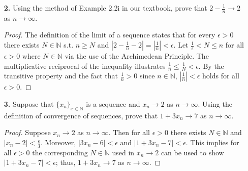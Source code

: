 \documentclass[ 12pt ]{article}
\begin{document}
\begin{enumerate}
\begin{enumerate}
		\item[\textbf{d.}] If $x_n$ converges to zero and $y_n > 0$ for all
		$n \in \mathbb{N}$, then $x_n y_n$ converges.

		\begin{proof}[Disproof]
			Let $x_n = \frac{1}{n}$ and $y_n = n^2$. We can see that
			$\frac{1}{n} \rightarrow 0$ as $n \rightarrow \infty$. Also
			$n^2 > 0$ for all $n \in \mathbb{N}$, otherwise this would
			contradict closure of $\mathbb{N}$ under multiplication. The product
			$x_n y_n = \frac{1}{n} \cdot n^2 = n$ which does not converge as
			$n \rightarrow \infty$.
		\end{proof}

	\end{enumerate}


	\item[\textbf{2.}] Using the method of Example 2.2i in our textbook, prove
	that $2 - \frac{1}{n} \rightarrow 2$ as $n \rightarrow \infty$.

	\begin{proof}
		The definition of the limit of a sequence states that for every
		$\epsilon > 0$ there exists $N \in \mathbb{N}$ s.t. $n \geq N$
		and $|2 - \frac{1}{n} - 2| = |\frac{1}{n}| < \epsilon$.
		Let $\frac{1}{\epsilon} < N \leq n$ for all $\epsilon > 0$ where
		$N \in \mathbb{N}$ via the use of the Archimedean Principle. The
		multiplicative reciprocal of the inequality illustrates
		$\frac{1}{n} \leq \frac{1}{N} < \epsilon$. By the transitive property
		and the fact that $\frac{1}{n} > 0$ since $n \in \mathbb{N}$,
		$|\frac{1}{n}| < \epsilon$ holds for all $\epsilon > 0$.
	\end{proof}


	\item[\textbf{3.}] Suppose that $\{ x_n \}_{x \in \mathbb{N}}$ is a
	sequence and $x_n \rightarrow 2$ as $n \rightarrow \infty$. Using the
	definition of convergence of sequences, prove that
	$1 + 3x_n \rightarrow 7$ as $n \rightarrow \infty$.

	\begin{proof}
		Suppose $x_n \rightarrow 2$ as $n \rightarrow \infty$. Then for all
		$\epsilon > 0$ there exists $N \in \mathbb{N}$ and
		$|x_n - 2| < \frac{\epsilon}{3}$. Moreover, $|3x_n - 6| < \epsilon$
		and $|1 + 3x_n - 7| < \epsilon$. This implies for all $\epsilon > 0$
		the corresponding $N \in \mathbb{N}$ used in $x_n \rightarrow 2$ can
		be used to show $|1 + 3x_n - 7| < \epsilon$; thus,
		$1 + 3x_n \rightarrow 7$ as $n \rightarrow \infty$.
	\end{proof}
	\newpage



\end{enumerate}
\end{document}
